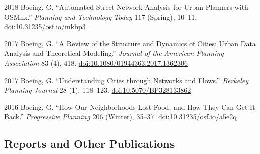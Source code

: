 \documentclass[12pt,letterpaper]{report}
\begin{document}
    \begin{tablist}

        \item[2018] \tab{}Boeing, G. \enquote{Automated Street Network Analysis for Urban Planners with OSMnx.} \textit{Planning and Technology Today} 117 (Spring), 10--11. \href{https://doi.org/10.31235/osf.io/mkbp3}{doi:10.31235/osf.io/mkbp3}

        \item[2017] \tab{}Boeing, G. \enquote{A Review of the Structure and Dynamics of Cities: Urban Data Analysis and Theoretical Modeling.} \textit{Journal of the American Planning Association} 83 (4), 418. \href{https://doi.org/10.1080/01944363.2017.1362306}{doi:10.1080/01944363.2017.1362306}

        \item[2017] \tab{}Boeing, G. \enquote{Understanding Cities through Networks and Flows.} \textit{Berkeley Planning Journal} 28 (1), 118--123. \href{https://doi.org/10.5070/BP328133862}{doi:10.5070/BP328133862}

        \item[2016] \tab{}Boeing, G. \enquote{How Our Neighborhoods Lost Food, and How They Can Get It Back.} \textit{Progressive Planning} 206 (Winter), 35--37. \href{https://doi.org/10.31235/osf.io/a5e2q}{doi:10.31235/osf.io/a5e2q}

    \end{tablist}



    \subsection*{Reports and Other Publications}
\end{document}
